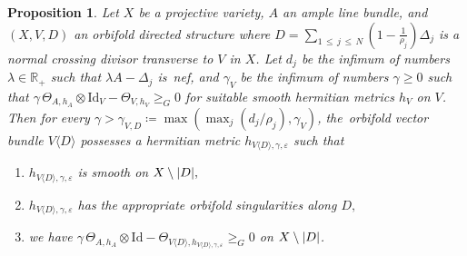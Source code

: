\documentclass[10pt,a4paper]{article}
\DeclarePairedDelimiter{\abs}{\lvert}{\rvert}
\newcommand*\Id{\mathrm{Id}}
\newcommand*\bR{\mathbb{R}}
\let\leq\leqslant
\let\geq\geqslant
\newcommand*\bydef{\coloneqq}
\newtheorem{prop}[cdrthm]{Proposition}
\numberwithin{equation}{section}
\begin{document}
\begin{prop}\label{prop:orbi_metric}
Let $X$ be a projective variety, $A$ an ample line bundle, and $(X,V,D)$ an orbifold directed structure where
$D=\sum_{1\,\leq\,j\,\leq\,N}(1-\tfrac{1}{\rho_j})\Delta_j$ is a normal crossing divisor transverse to $V$ in $X$. Let $d_j$ be the infimum of numbers
$\lambda\in\bR_+$ such that $\lambda A-\Delta_j$ is~nef, and $\gamma_V$ be the infimum of numbers $\gamma\geq 0$ such that $\gamma\,
\Theta_{A,h_A}\otimes\Id_V-\Theta_{V,h_V}\geq_G0$ for suitable smooth hermitian metrics $h_V$ on $V$. Then for every
$\gamma>\gamma_{V,D}\bydef\max(\max_j(d_j/\rho_j),\gamma_V)$, the~orbifold vector bundle $V\langle D\rangle$ possesses a hermitian metric $h_{V\langle D\rangle,\gamma,\varepsilon}$ such that
\begin{enumerate}
\item
$h_{V\langle D\rangle,\gamma,\varepsilon}$ is smooth on $X\setminus\abs{D},$
\item
$h_{V\langle D\rangle,\gamma,\varepsilon}$ has the appropriate orbifold singularities along $D,$
\item we have $\gamma\,\Theta_{A,h_A}\otimes\Id-
\Theta_{V\langle D\rangle,h_{V\langle D\rangle,\gamma,\varepsilon}}\geq_G0$ on $X\setminus\abs{D}$.
\end{enumerate}
\end{prop}
\end{document}
